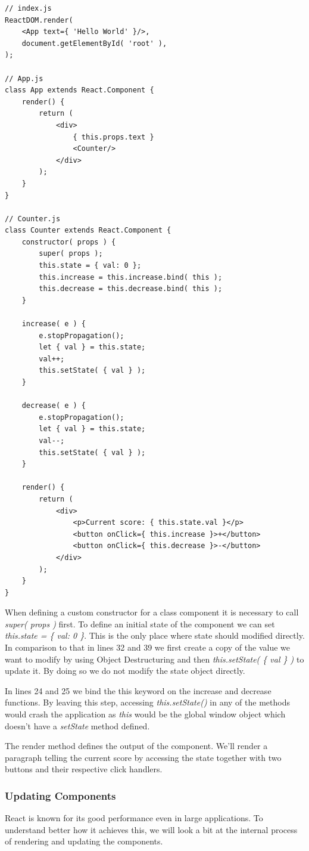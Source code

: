 \begin{lstlisting}[caption={Counter Component}]
// index.js
ReactDOM.render(
	<App text={ 'Hello World' }/>,
	document.getElementById( 'root' ),
);

// App.js
class App extends React.Component {
	render() {
		return (
			<div>
				{ this.props.text }
				<Counter/>
			</div>
		);
	}
}

// Counter.js
class Counter extends React.Component {
	constructor( props ) {
		super( props );
		this.state = { val: 0 };
		this.increase = this.increase.bind( this );
		this.decrease = this.decrease.bind( this );
	}

	increase( e ) {
		e.stopPropagation();
		let { val } = this.state;
		val++;
		this.setState( { val } );
	}

	decrease( e ) {
		e.stopPropagation();
		let { val } = this.state;
		val--;
		this.setState( { val } );
	}

	render() {
		return (
			<div>
				<p>Current score: { this.state.val }</p>
				<button onClick={ this.increase }>+</button>
				<button onClick={ this.decrease }>-</button>
			</div>
		);
	}
}
\end{lstlisting}

When defining a custom constructor for a class component it is necessary to call \emph{super( props )} first. To define an initial state of the component we can set \emph{this.state = \{ val: 0 \}}. This is the only place where state should modified directly. In comparison to that in lines 32 and 39 we first create a copy of the value we want to modify by using Object Destructuring and then \emph{this.setState( \{ val \} )} to update it. By doing so we do not modify the state object directly.

In lines 24 and 25 we bind the this keyword on the increase and decrease functions. By leaving this step, accessing \emph{this.setState()} in any of the methods would crash the application as \emph{this} would be the global window object which doesn't have a \emph{setState} method defined.

The render method defines the output of the component. We'll render a paragraph telling the current score by accessing the state together with two buttons and their respective click handlers.

\subsubsection{Updating Components}
React is known for its good performance \cite{LinaSpukas} even in large applications. To understand better how it achieves this, we will look a bit at the internal process of rendering and updating the components.


